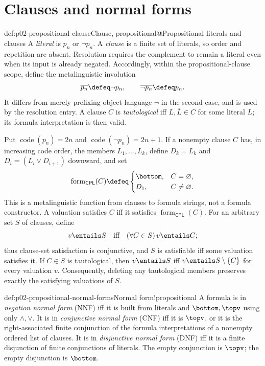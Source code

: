 \section{Clauses and normal forms}
\label{sec:p02-propositional-normal-forms}

\begin{hbdefinition}{def:p02-propositional-clause}{Clause, propositional@Propositional literals and clauses}
A \emph{literal} is \(p_n\) or \(\neg p_n\).
A \emph{clause} is a finite set of literals, so
order and repetition are absent.  Resolution requires the complement to
remain a literal even when its input is already negated.  Accordingly, within
the propositional-clause scope, define the metalinguistic involution
\[
 \overline{p_n}\defeq\neg p_n,
 \qquad
 \overline{\neg p_n}\defeq p_n.
\]
It differs from merely prefixing object-language \(\neg\) in the second case,
and is used by the resolution entry.  A clause \(C\) is
\emph{tautological} iff \(L,\overline L\in C\) for some literal \(L\); its
formula interpretation is then valid.

Put
\(\operatorname{code}(p_n)=2n\) and
\(\operatorname{code}(\neg p_n)=2n+1\).  If a nonempty clause \(C\) has,
in increasing code order, the members \(L_1,\ldots,L_k\), define
\(D_k=L_k\) and \(D_i=(L_i\lor D_{i+1})\) downward, and set
\[
 \operatorname{form}_{\mathsf{CPL}}(C)\defeq
 \begin{cases}\bottom,&C=\varnothing,\\D_1,&C\ne\varnothing.\end{cases}
\]
This is a metalinguistic function from clauses to formula strings, not a
formula constructor.  A valuation satisfies \(C\) iff it satisfies
\(\operatorname{form}_{\mathsf{CPL}}(C)\).  For an arbitrary set \(S\) of
clauses, define
\[
 v\entails S \quad\text{iff}\quad
 (\forall C\in S)\,v\entails C;
\]
thus clause-set satisfaction is conjunctive, and \(S\) is satisfiable iff
some valuation satisfies it.  If \(C\in S\) is tautological, then
\(v\entails S\) iff \(v\entails S\setminus\{C\}\) for every valuation \(v\).
Consequently, deleting any tautological members preserves exactly the
satisfying valuations of \(S\).
\end{hbdefinition}

\begin{hbdefinition}{def:p02-propositional-normal-forms}{Normal form!propositional}
A formula is in \emph{negation normal form} (NNF) iff it is built from
literals and \(\bottom,\topv\) using only \(\land,\lor\).  It is in
\emph{conjunctive normal form} (CNF) iff it is \(\topv\), or it is the
right-associated finite conjunction of the formula interpretations of a
nonempty ordered list of clauses.  It is in \emph{disjunctive normal form}
(DNF) iff it is a finite disjunction of finite conjunctions of literals.
The empty conjunction is \(\topv\); the empty disjunction is \(\bottom\).
\end{hbdefinition}

